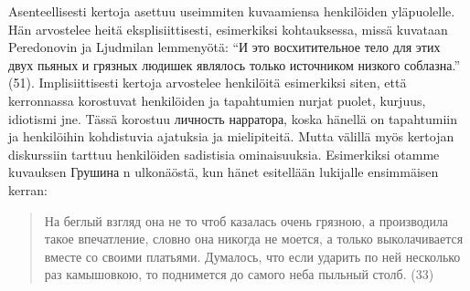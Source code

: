 \documentclass[12pt,a4paper]{article}
\begin{document}
Asenteellisesti kertoja asettuu useimmiten kuvaamiensa henkilöiden yläpuolelle. Hän arvostelee heitä eksplisiittisesti, esimerkiksi kohtauksessa, missä kuvataan Peredonovin ja Ljudmilan lemmenyötä: \enquote{И это восхитительное тело для этих двух пьяных и грязных людишек являлось только источником низкого соблазна.} (51). Implisiittisesti kertoja arvostelee henkilöitä esimerkiksi siten, että kerronnassa korostuvat henkilöiden ja tapahtumien nurjat puolet, kurjuus, idiotismi jne. 
Tässä korostuu личность нарратора, koska hänellä on tapahtumiin ja henkilöihin kohdistuvia ajatuksia ja mielipiteitä. Mutta välillä myös kertojan diskurssiin tarttuu henkilöiden sadistisia ominaisuuksia. Esimerkiksi otamme kuvauksen Грушина n ulkonäöstä, kun hänet esitellään lukijalle ensimmäisen kerran:

\begin{quote}
На беглый взгляд она не то
чтоб казалась очень грязною, а производила такое впечатление, словно
она никогда не моется, а только выколачивается вместе со своими 
платьями. Думалось, что если ударить по ней несколько раз камышовкою,
то поднимется до самого неба пыльный столб.
(33)
\end{quote}
\end{document}
